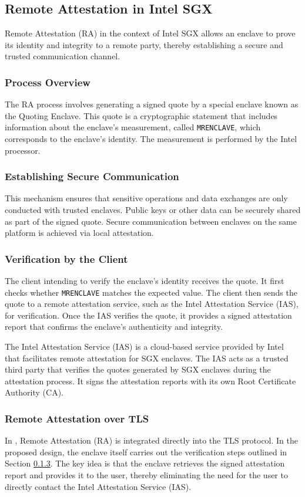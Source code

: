 \subsection{Remote Attestation in Intel SGX}
Remote Attestation (RA) in the context of Intel SGX allows an enclave to prove its identity and integrity to a remote party, thereby establishing a secure and trusted communication channel.

\subsubsection{Process Overview}
The RA process involves generating a signed quote by a special enclave known as the Quoting Enclave. This quote is a cryptographic statement that includes information about the enclave's measurement, called \texttt{MRENCLAVE}, which corresponds to the enclave's identity. The measurement is performed by the Intel processor.

\subsubsection{Establishing Secure Communication}
This mechanism ensures that sensitive operations and data exchanges are only conducted with trusted enclaves. Public keys or other data can be securely shared as part of the signed quote. Secure communication between enclaves on the same platform is achieved via local attestation.

\subsubsection{Verification by the Client} \label{sec:verification-client}
The client intending to verify the enclave's identity receives the quote. It first checks whether \texttt{MRENCLAVE} matches the expected value. The client then sends the quote to a remote attestation service, such as the Intel Attestation Service (IAS), for verification. Once the IAS verifies the quote, it provides a signed attestation report that confirms the enclave's authenticity and integrity.

The Intel Attestation Service (IAS) is a cloud-based service provided by Intel that facilitates remote attestation for SGX enclaves. The IAS acts as a trusted third party that verifies the quotes generated by SGX enclaves during the attestation process. It signs the attestation reports with its own Root Certificate Authority (CA).

\subsubsection{Remote Attestation over TLS} 
In \cite{sgx-ra-tls-white-paper}, Remote Attestation (RA) is integrated directly into the TLS protocol. In the proposed design, the enclave itself carries out the verification steps outlined in Section \ref{sec:verification-client}. The key idea is that the enclave retrieves the signed attestation report and provides it to the user, thereby eliminating the need for the user to directly contact the Intel Attestation Service (IAS).

